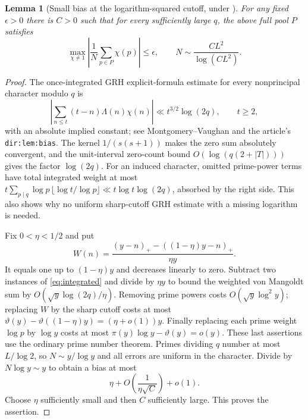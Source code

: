 \documentclass[11pt]{article}
\newtheorem{lemma}[theorem]{Lemma}
\theoremstyle{remark}\newtheorem{remark}[theorem]{Remark}
\begin{document}
\begin{lemma}[Small bias at the logarithm-squared cutoff, under \DGRH]\label{lem:bias}
For any fixed $\epsilon>0$ there is $C>0$ such that for every sufficiently large $q$, the above full pool $P$ satisfies
\[
 \max_{\chi\ne1}\left|\frac1N\sum_{p\in P}\chi(p)\right|\le\epsilon,
 \qquad N\sim\frac{CL^2}{\log(CL^2)}.
\]
\end{lemma}
\begin{proof}
The once-integrated GRH explicit-formula estimate for every nonprincipal character modulo $q$ is
\begin{equation}\label{eq:integrated}
 \left|\sum_{n\le t}(t-n)\Lambda(n)\chi(n)\right|\ll t^{3/2}\log(2q),\qquad t\ge2,
\end{equation}
with an absolute implied constant; see Montgomery--Vaughan \cite[Chapter 13, (13.28)]{mv} and the article's \texttt{dir:lem:bias}. The kernel $1/(s(s+1))$ makes the zero sum absolutely convergent, and the unit-interval zero-count bound $O(\log(q(2+|T|)))$ gives the factor $\log(2q)$. For an induced character, omitted prime-power terms have total integrated weight at most $t\sum_{p\mid q}\log p\,\lfloor\log t/\log p\rfloor\ll t\log t\log(2q)$, absorbed by the right side. This also shows why no uniform sharp-cutoff GRH estimate with a missing logarithm is needed.

Fix $0<\eta<1/2$ and put
\[
 W(n)=\frac{(y-n)_+-((1-\eta)y-n)_+}{\eta y}.
\]
It equals one up to $(1-\eta)y$ and decreases linearly to zero. Subtract two instances of \eqref{eq:integrated} and divide by $\eta y$ to bound the weighted von Mangoldt sum by $O(\sqrt y\log(2q)/\eta)$. Removing prime powers costs $O(\sqrt y\log^2 y)$; replacing $W$ by the sharp cutoff costs at most $\vartheta(y)-\vartheta((1-\eta)y)=(\eta+o(1))y$. Finally replacing each prime weight $\log p$ by $\log y$ costs at most $\pi(y)\log y-\vartheta(y)=o(y)$. These last assertions use the ordinary prime number theorem. Primes dividing $q$ number at most $L/\log2$, so $N\sim y/\log y$ and all errors are uniform in the character. Divide by $N\log y\sim y$ to obtain a bias at most
\[
 \eta+O\left(\frac1{\eta\sqrt C}\right)+o(1).
\]
Choose $\eta$ sufficiently small and then $C$ sufficiently large. This proves the assertion.
\end{proof}
\end{document}
